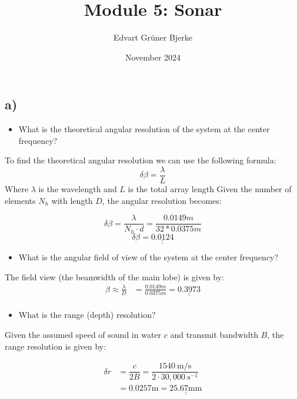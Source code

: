 \documentclass{article}
\title{Module 5: Sonar
}
\author{Edvart Grüner Bjerke}
\date{November 2024}
\begin{document}
\maketitle


\subsection*{a)}
\begin{itemize}
    \item What is the theoretical angular resolution of the system at the center frequency?
\end{itemize}
To find the theoretical angular resolution we can use the following formula:
\[\delta \beta = \frac{\lambda}{L} \]
Where $\lambda$ is the wavelength and $L$ is the total array length
Given the number of elements $N_h$ with length $D$, the angular resolution becomes:

\[\delta \beta = \frac{\lambda}{N_h\cdot d} = \frac{0.0149m}{32*0.0375m} \]
\[\delta \beta = \underline{\underline{0.0124}}\]

\begin{itemize}
    \item What is the angular ﬁeld of view of the system at the center frequency?
\end{itemize}

\noindent The field view (the beamwidth of the main lobe) is given by:
\begin{align}
    \beta \approx \frac{\lambda}{D} &= \frac{0.0149m}{0.0375m} = \underline{\underline{0.3973}} \\
\end{align}

\begin{itemize}
    \item What is the range (depth) resolution?
\end{itemize}

Given the assumed speed of sound in water $c$ and transmit bandwidth $B$, the range resolution is given by:


\begin{equation*}
    \begin{aligned}
        \delta r &= \dfrac{c}{2B} = \dfrac{1540 \ \text{m/s}}{2 \cdot 30,000 \ \text{s}^{-1}} \\
        &= 0.0257 \text{m} = \underline{\underline{25.67 \text{mm}}}
    \end{aligned}
\end{equation*}
\end{document}
